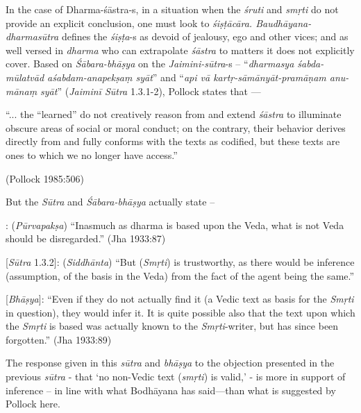 In the case of Dharma-śāstra-s, in a situation when the {\sl śruti} and {\sl smṛti} do not provide an explicit conclusion, one must look to {\sl śiṣṭācāra. Baudhāyana-dharmasūtra} deﬁnes the {\sl śiṣṭa}-s as devoid of jealousy, ego and other vices; and as well versed in {\sl dharma} who can extrapolate {\sl śāstra} to matters it does not explicitly cover. Based on {\sl Śābara-bhāṣya} on the {\sl Jaimini-sūtra}-s -- ``{\sl dharmasya śabda-mūlatvād aśabdam-anapekṣaṃ syāt}''  and ``{\sl api vā kartṛ-sāmānyāt-pramāṇam anu-mānaṃ syāt}'' ({\sl Jaiminī Sūtra} 1.3.1-2), Pollock states that ---

\begin{myquote}
``... the ``learned'' do not creatively reason from and extend {\sl śāstra} to illuminate obscure areas of social or moral conduct; on the contrary, their behavior derives directly from and fully conforms with the texts as codiﬁed, but these texts are ones to which we no longer have access.'' 

\hfill (Pollock 1985:506)
\end{myquote}

But the {\sl Sūtra} and {\sl Śābara-bhāṣya} actually state --
\begin{myquote}
[{\sl Sūtra} 1.3.1]: ({\sl Pūrvapakṣa}) ``Inasmuch as dharma is based upon the Veda, what is not Veda should be disregarded.'' (Jha 1933:87) 

[{\sl Sūtra} 1.3.2]: ({\sl Siddhānta}) ``But ({\sl Smṛti}) is trustworthy, as there would be inference (assumption, of the basis in the Veda) from the fact of the agent being the same.'' 

[{\sl Bhāṣya}]: ``Even if they do not actually find it (a Vedic text as basis for the {\sl Smṛti} in question), they would infer it. It is quite possible also that the text upon which the {\sl Smṛti} is based was actually known to the {\sl Smṛti}-writer, but has since been forgotten.'' (Jha 1933:89)
\end{myquote}

The response given in this {\sl sūtra} and {\sl bhāṣya} to the objection presented in the previous {\sl sūtra} - that `no non-Vedic text ({\sl smṛti}) is valid,' - is more in support of inference -- in line with what Bodhāyana has said---than what is suggested by Pollock here.\\[-18pt]

